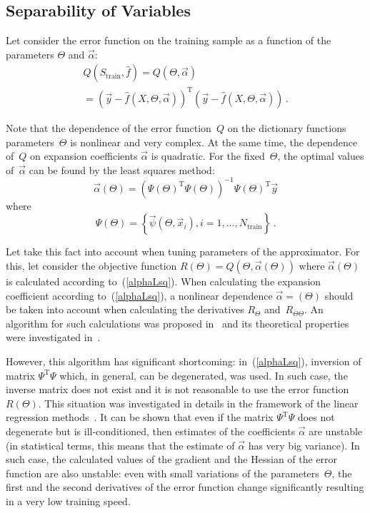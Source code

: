 \begin{multicols}{2}
\subsection{Separability of Variables}
\label{separability}

\noindent
Let consider the error function on the training sample as a function of the parameters $\Theta$ and $\vec \alpha$:
\begin{multline*}
  Q\left( S_{\mathrm{train}}, \hat f\right) =
  Q\left( \Theta, {\vec \alpha} \right)\\
  {}=   \left( \vec y - \hat f \left( X, \Theta, \vec\alpha \right) \right)^{\mathrm{T}}
  \left( \vec y - \hat f \left( X, \Theta, \vec\alpha \right) \right)\,.
\end{multline*}

Note that the dependence of the error function~$Q$ on the dictionary 
functions parameters~$\Theta$ is nonlinear and very complex.
At the same time, the dependence of~$Q$ on expansion coefficients $\vec \alpha$ is quadratic.
For the fixed~$\Theta$, the optimal values of~$\vec\alpha$ can be found by the least squares 
method:
\begin{equation}
\label{alphaLsq}
\vec\alpha \left( \Theta \right) =
 \left( \Psi\left( \Theta \right)^{\mathrm{T}} \Psi\left( \Theta \right) \right)^{-1}
 \Psi\left( \Theta \right)^{\mathrm{T}} \vec y
 \end{equation}
  where  
  $$
  \Psi\left( \Theta \right) = \left\{{\vec \psi} \left( {\Theta}, {\vec x}_i \right),
  i = 1,\ldots,N_{\mathrm{train}}\right\}\,.
$$

Let take this fact into account when tuning parameters of the approximator. 
For this, let consider the objective function
  $R\left( \Theta \right) = Q\left( \Theta, \vec\alpha\left(\Theta\right) \right)$
  where $\vec\alpha\left(\Theta\right)$ is calculated according to~(\ref{alphaLsq}).
When calculating the expansion coefficient according to~(\ref{alphaLsq}), a 
nonlinear dependence 
$\vec\alpha =  \left( \Theta \right)$ should be taken into account when calculating 
the derivatives $R_\Theta$ and~$R_{\Theta\Theta}$.
An algorithm for such calculations was proposed in~\cite{golub} and its 
theoretical properties were investigated in~\cite{ruhe}.

However, this algorithm has significant shortcoming: in~(\ref{alphaLsq}), 
inversion of matrix $\Psi^{\mathrm{T}} \Psi$  which, in general, can be degenerated, was used. 
In such case, the inverse matrix does not exist and it is not reasonable to use the error 
function $R\left( \Theta \right)$.
This situation was investigated in details in the framework of the linear regression methods~\cite{demidenko}.
It can be shown that even if the matrix
$\Psi^{\mathrm{T}} \Psi$ does not degenerate but is ill-conditioned, then estimates of the coefficients
 $\vec \alpha$ are unstable (in statistical terms, this means that the estimate of
 $\vec \alpha$ has very big variance).
In such case, the calculated values of the gradient and the Hessian of the error function 
are also unstable: even with small variations of the parameters~$\Theta$, 
the first and the second derivatives of the error function change significantly 
resulting in a very low training speed.
 

\end{multicols}
